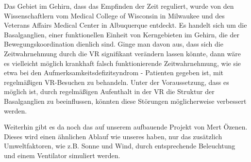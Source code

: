 \documentclass{Bericht}
\begin{document}
Das Gebiet im Gehirn, dass das Empfinden der Zeit reguliert, wurde von den Wissenschaftlern vom Medical College of Wisconsin in Milwaukee und des Veterans Affairs Medical Center in Albuquerque entdeckt. Es handelt sich um die Basalganglien, einer funktionellen Einheit von Kerngebieten im Gehirn, die der Bewegungskoordination dienlich sind. Ginge man davon aus, dass sich die Zeitwahrnehmung durch die VR signifikant verändern lassen könnte, dann wäre es vielleicht möglich krankhaft falsch funktionierende Zeitwahrnehmung, wie sie etwa bei den Aufmerksamkeitsdefizitsyndrom - Patienten gegeben ist, mit regelmäßigen VR-Besuchen zu behandeln. Unter der Voraussetzung, dass es  möglich ist, durch regelmäßigen Aufenthalt in der VR die Struktur der Basalganglien zu beeinflussen, könnten diese Störungen möglicherweise verbessert werden.

 
Weiterhin gibt es da noch das auf unserem aufbauende Projekt von Mert Özenen. Dieses wird einen ähnlichen Ablauf wie unseres haben, nur das zusätzlich Umweltfaktoren, wie z.B. Sonne und Wind, durch entsprechende Beleuchtung und einem Ventilator simuliert werden.


	
\end{document}
